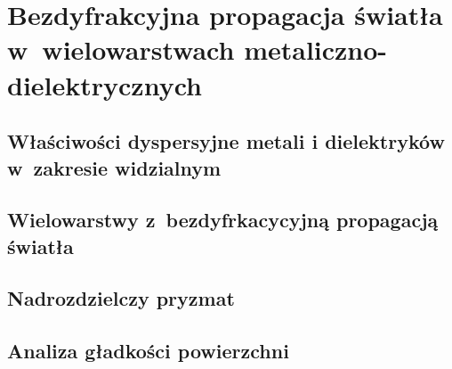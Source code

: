 \chapter{Bezdyfrakcyjna propagacja światła w~wielowarstwach metaliczno-dielektrycznych}
\label{art:nondiff}

\section{Właściwości dyspersyjne metali i dielektryków w~zakresie widzialnym}

\section{Wielowarstwy z~bezdyfrkacycyjną propagacją światła}

\section{Nadrozdzielczy pryzmat}


\section{Analiza gładkości powierzchni}



